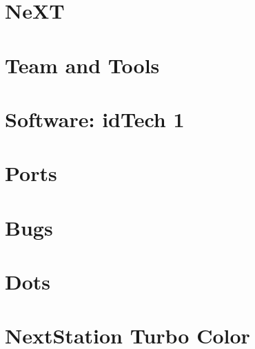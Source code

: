 \documentclass{book}
\begin{document}
        


        
     \chapter{NeXT}
          


    

    \chapter{Team and Tools}
       
       
       
      
      
      
      
      




     \chapter{Software: idTech 1}
      
      
      
      
       
       
       
       
       
       
       
       
          
        
      

    \chapter{Ports}        
          



    \appendix
    \appendixpage
      \chapter{Bugs}
      
    \chapter{Dots}  
      


    \chapter{NextStation Turbo Color}
    
    
\end{document}
